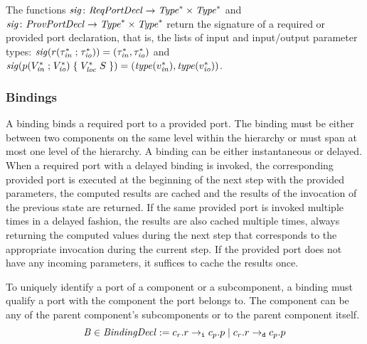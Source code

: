 \documentclass[a4paper,10pt,english]{article}
\begin{document}
The functions $\mathit{sig} \colon
\mathit{ReqPortDecl} \rightarrow \mathit{Type}^* \times \mathit{Type}^*$ and $\mathit{sig} \colon \mathit{ProvPortDecl} \rightarrow \mathit{Type}^* \times
\mathit{Type}^*$ return the signature of a required or provided port declaration, that is, the lists of input and input/output
parameter types:
$\mathit{sig}(r \mathtt{(} \tau_\mathit{in}^* \; \mathtt{;} \; \tau_\mathit{io}^* \mathtt{)}) = (\tau_\mathit{in}^*,
\tau_\mathit{io}^*)$ and
$\mathit{sig}(p \mathtt{(} V^*_\mathit{in} \; \mathtt{;} \; V^*_\mathit{io} \mathtt{) \; \{} \; V^*_\mathit{loc} \; S \; \mathtt{\}})
= (\mathit{type}(v_{\mathit{in}}^*), \mathit{type}(v_{\mathit{io}}^*))$.

\subsubsection{Bindings}
A binding binds a required port to a provided port. The binding must be either between two components on the
same level within the hierarchy or must span at most one level of the hierarchy. A binding can be either
instantaneous or delayed. When a required port with a delayed binding is invoked, the corresponding provided port is executed
at the beginning of the next step with the provided parameters, the computed results are cached and the results of the invocation
of the previous state are returned. If the same provided port is invoked multiple times in a delayed fashion, the results are also
cached multiple times, always returning the computed values during the next step that corresponds to the appropriate invocation
during the current step. If the provided port does not have any incoming parameters, it suffices to cache the results once.

To uniquely identify a port of a component or a subcomponent, a binding must qualify a port with the component the port belongs
to. The component can be any of the parent component's subcomponents or to the parent component itself.
\begin{equation*} 
	\mathit{B} \in \mathit{BindingDecl} :=
		c_r\mathtt{.}r \; \mathtt{\rightarrow_i} \; c_p\mathtt{.}p
		\mid
		c_r\mathtt{.}r \; \mathtt{\rightarrow_d} \; c_p\mathtt{.}p
\end{equation*}
\end{document}
